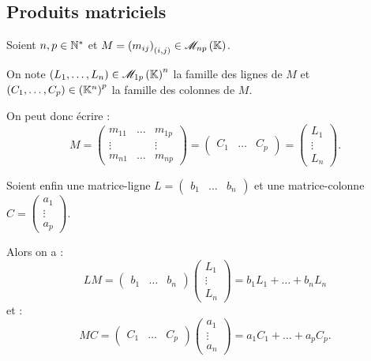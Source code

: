 \subsection{Produits matriciels}

\begin{rem}
Soient \(n,p\in\mathbb{N}^*\) et \(M=\paren{m_{ij}}_{\paren{i,j}}\in\M{np}\).

On note \(\paren{L_1,\dots,L_n}\in\M{1p}^n\) la famille des lignes de \(M\) et \(\left(C_1,\dots,C_p\right)\in\left(\mathbb{K}^n\right)^p\) la famille des colonnes de \(M\).

On peut donc écrire : \[M=\begin{pmatrix}
m_{11} & \dots & m_{1p} \\
\vdots &  & \vdots \\
m_{n1} & \dots & m_{np}
\end{pmatrix}=\begin{pmatrix}
C_1 & \dots & C_p
\end{pmatrix}=\begin{pmatrix}
L_1 \\
\vdots \\
L_n
\end{pmatrix}.\]

Soient enfin une matrice-ligne \(L=\begin{pmatrix}
b_1 & \dots & b_n
\end{pmatrix}\) et une matrice-colonne \(C=\begin{pmatrix}
a_1 \\
\vdots \\
a_p
\end{pmatrix}\).

Alors on a : \[LM=\begin{pmatrix}
b_1 & \dots & b_n
\end{pmatrix}\begin{pmatrix}
L_1 \\
\vdots \\
L_n
\end{pmatrix}=b_1L_1+\dots+b_nL_n\] et : \[MC=\begin{pmatrix}
C_1 & \dots & C_p
\end{pmatrix}\begin{pmatrix}
a_1 \\
\vdots \\
a_n
\end{pmatrix}=a_1C_1+\dots+a_pC_p.\]
\end{rem}

